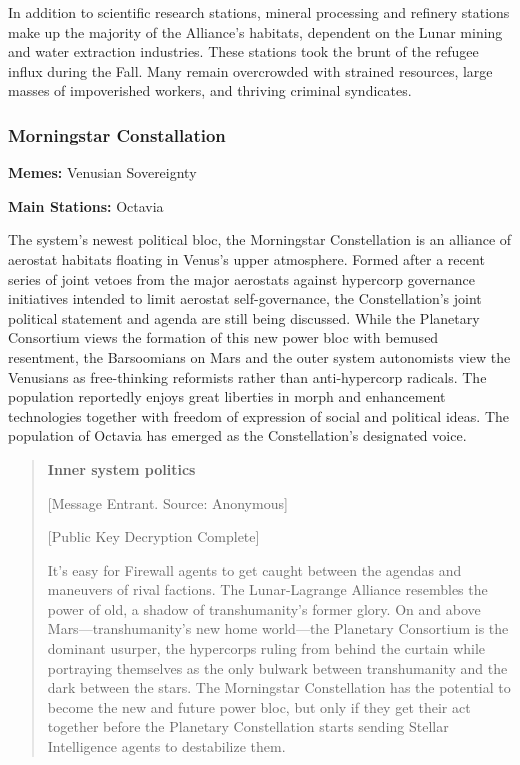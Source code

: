 In addition to scientific research stations, mineral processing and refinery stations make up the majority of the Alliance's habitats, dependent on the Lunar mining and water extraction industries. These stations took the brunt of the refugee influx during the Fall. Many remain overcrowded with strained resources, large masses of impoverished workers, and thriving criminal syndicates. 

\subsubsection{Morningstar Constallation} \label{sec:morn-const} 

\textbf{Memes:} Venusian Sovereignty 

\textbf{Main Stations:} Octavia 

The system's newest political bloc, the Morningstar Constellation is an alliance of aerostat habitats floating in Venus's upper atmosphere. Formed after a recent series of joint vetoes from the major aerostats against hypercorp governance initiatives intended to limit aerostat self-governance, the Constellation's joint political statement and agenda are still being discussed. While the Planetary Consortium views the formation of this new power bloc with bemused resentment, the Barsoomians on Mars and the outer system autonomists view the Venusians as free-thinking reformists rather than anti-hypercorp radicals. The population reportedly enjoys great liberties in morph and enhancement technologies together with freedom of expression of social and political ideas. The population of Octavia has emerged as the Constellation's designated voice. 

\begin{quotation} \textbf{Inner system politics} 

[Message Entrant. Source: Anonymous] 

[Public Key Decryption Complete] 

It's easy for Firewall agents to get caught between the agendas and maneuvers of rival factions. The Lunar-Lagrange Alliance resembles the power of old, a shadow of transhumanity's former glory. On and above Mars—transhumanity's new home world—the Planetary Consortium is the dominant usurper, the hypercorps ruling from behind the curtain while portraying themselves as the only bulwark between transhumanity and the dark between the stars. The Morningstar Constellation has the potential to become the new and future power bloc, but only if they get their act together before the Planetary Constellation starts sending Stellar Intelligence agents to destabilize them. \end{quotation} 

